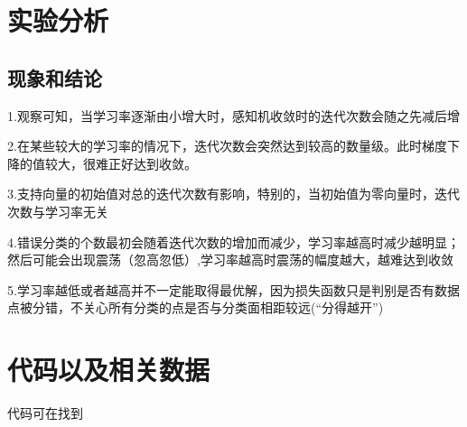 \documentclass[10pt,a4paper]{ctexart}
\begin{document}
\newpage
\section{实验分析}
\subsection{现象和结论}
  {1.观察可知，当学习率逐渐由小增大时，感知机收敛时的迭代次数会随之先减后增}
  
  {2.在某些较大的学习率的情况下，迭代次数会突然达到较高的数量级。此时梯度下降的值较大，很难正好达到收敛。}
  
  {3.支持向量的初始值对总的迭代次数有影响，特别的，当初始值为零向量时，迭代次数与学习率无关}
  
  {4.错误分类的个数最初会随着迭代次数的增加而减少，学习率越高时减少越明显；然后可能会出现震荡（忽高忽低）,学习率越高时震荡的幅度越大，越难达到收敛}
  
  {5.学习率越低或者越高并不一定能取得最优解，因为损失函数只是判别是否有数据点被分错，不关心所有分类的点是否与分类面相距较远(``分得越开'')}
  \section{代码以及相关数据}
  {代码可在找到}
\end{document}
